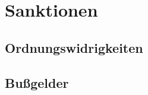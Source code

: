 \chapter{Sanktionen}\label{ch:sanktionen}

\section{Ordnungswidrigkeiten}\label{sec:ordnungswidrigkeiten}

\section{Bußgelder}\label{sec:bussgelder}
